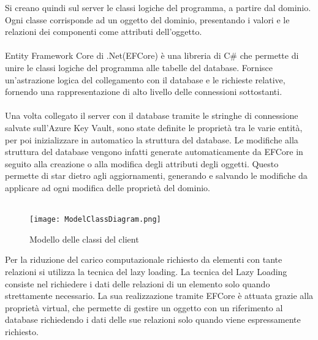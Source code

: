 Si creano quindi sul server le classi logiche del programma, a partire dal dominio. 
Ogni classe corrisponde ad un oggetto del dominio, presentando i valori e le relazioni dei componenti come attributi dell’oggetto.\\
\\
Entity Framework Core di .Net(EFCore) è una libreria di C\# che permette di unire le classi logiche del programma alle tabelle del database. 
Fornisce un’astrazione logica del collegamento con il database e le richieste relative, fornendo una rappresentazione di alto livello delle connessioni sottostanti. \\
\\
Una volta collegato il server con il database tramite le stringhe di connessione salvate sull’Azure Key Vault, 
sono state definite le proprietà tra le varie entità, per poi inizializzare in automatico la struttura del database. 
Le modifiche alla struttura del database vengono infatti generate automaticamente da EFCore in seguito alla creazione o alla modifica degli attributi degli oggetti. 
Questo permette di star dietro agli aggiornamenti, generando e salvando le modifiche da applicare ad ogni modifica delle proprietà del dominio.\\
\\
\begin{figure}[h!]
    \begin{center}
        \texttt{[image: ModelClassDiagram.png]}
        \caption{Modello delle classi del client}
    \end{center}
\end{figure}

Per la riduzione del carico computazionale richiesto da elementi con tante relazioni si utilizza la tecnica del lazy loading. 
La tecnica del Lazy Loading consiste nel richiedere i dati delle relazioni di un elemento solo quando strettamente necessario. 
La sua realizzazione tramite EFCore è attuata grazie alla proprietà virtual, 
che permette di gestire un oggetto con un riferimento al database richiedendo i dati delle sue relazioni solo quando viene espressamente richiesto.
\clearpage